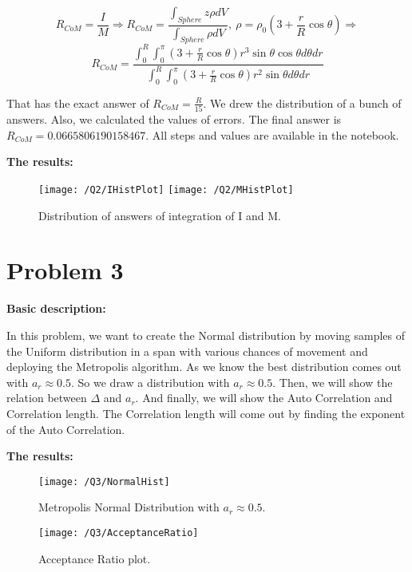 \documentclass{article}
\begin{document}
    $$R_{CoM} = \frac{I}{M} \Rightarrow R_{CoM} = \frac{\int_{Sphere} z \rho dV}{\int_{Sphere} \rho dV},\ \rho = \rho_0 (3 + \frac{r}{R} \cos{\theta}) \Rightarrow$$
    $$ R_{CoM} = \frac{\int_0^R\int_0^\pi (3+\frac{r}{R}\cos{\theta})r^3\sin{\theta}\cos{\theta} d\theta dr}{\int_0^R\int_0^\pi (3+\frac{r}{R}\cos{\theta})r^2\sin{\theta} d\theta dr}$$

    That has the exact answer of $R_{CoM} = \frac{R}{15}$.
    We drew the distribution of a bunch of answers.
    Also, we calculated the values of errors.
    The final answer is $R_{CoM} = 0.0665806190158467$.
    All steps and values are available in the notebook.

    \textbf{The results:}

    \begin{figure}[!htb]
        \centering
        \texttt{[image: /Q2/IHistPlot]}
        \label{fig:2.1}
        \texttt{[image: /Q2/MHistPlot]}
        \label{fig:2.2}
        \caption{Distribution of answers of integration of I and M.}
    \end{figure}

    \pagebreak

    \section*{Problem 3}
    \textbf{Basic description:}

    In this problem, we want to create the Normal distribution
    by moving samples of the Uniform distribution in a span
    with various chances of movement and deploying the Metropolis algorithm.
    As we know the best distribution comes out with $a_r \approx 0.5$.
    So we draw a distribution with $a_r \approx 0.5$.
    Then, we will show the relation between $\Delta$ and $a_r$.
    And finally, we will show the Auto Correlation and Correlation length.
    The Correlation length will come out by finding the exponent of the Auto Correlation.

    \textbf{The results:}

    \begin{figure}[!htb]
        \centering
        \texttt{[image: /Q3/NormalHist]}
        \label{fig:3.1}
        \caption{Metropolis Normal Distribution with $a_r \approx 0.5$.}
    \end{figure}

    \begin{figure}[!htb]
        \centering
        \texttt{[image: /Q3/AcceptanceRatio]}
        \label{fig:3.2}
        \caption{Acceptance Ratio plot.}
    \end{figure}
\end{document}
